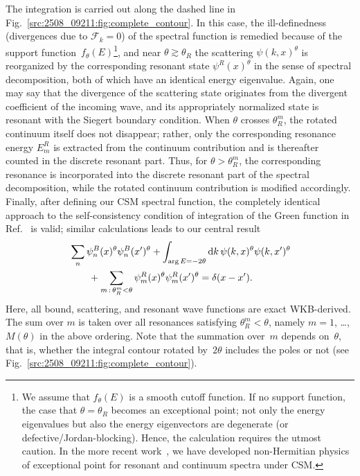 The integration is carried out along the dashed line in Fig.~\ref{src:2508_09211:fig:complete_contour}. In this case, the ill-definedness (divergences due to $\mathcal{F}_k=0$) of the spectral function is remedied because of the support function~$f_\theta(E)$\footnote{We assume that $f_\theta(E)$ is a smooth cutoff function.
If no support function, the case that $\theta=\theta_R$ becomes an exceptional point; not only the energy eigenvalues but also the energy eigenvectors are degenerate (or defective/Jordan-blocking). Hence, the calculation requires the utmost caution. In the more recent work~\cite{Morikawa:2025inx}, we have developed non-Hermitian physics of exceptional point for resonant and continuum spectra under CSM.}, and near $\theta\gtrsim\theta_R$ the scattering $\psi(k,x)^\theta$ is reorganized by the corresponding resonant state $\psi^R(x)^\theta$ in the sense of spectral decomposition, both of which have an identical energy eigenvalue. Again, one may say that the divergence of the scattering state originates from the divergent coefficient of the incoming wave, and its appropriately normalized state is resonant with the Siegert boundary condition.
When $\theta$ crosses $\theta_R^m$, the rotated continuum itself does not disappear; rather, only the corresponding resonance energy $E_m^R$ is extracted from the continuum contribution and is thereafter counted in the discrete resonant part.
Thus, for $\theta>\theta_R^m$, the corresponding resonance is incorporated into the discrete resonant part of the spectral decomposition, while the rotated continuum contribution is modified accordingly.
Finally, after defining our CSM spectral function,
the completely identical approach to the self-consistency condition of integration of the Green function in Ref.~\cite{Newton:1960} is valid; similar calculations leads to our central result
\begin{align}
    &\sum_n\psi_n^B(x)^\theta\psi_n^B(x')^\theta + \int_{\arg E=-2\theta} \mathrm{d} k\, \psi(k,x)^\theta\psi(k,x')^\theta \notag\\
    &\qquad
    + \sum_{m\,:\,\theta_R^m<\theta}\psi_m^R(x)^\theta\psi_m^R(x')^\theta
    = \delta(x-x') .
    \label{src:2508_09211:eq:complete_res}
\end{align}
Here, all bound, scattering, and resonant wave functions are exact WKB-derived.
The sum over $m$ is taken over all resonances satisfying $\theta_R^m<\theta$, namely $m=1$, \dots, $M(\theta)$ in the above ordering.
Note that the summation over~$m$ depends on~$\theta$, that is, whether the integral contour rotated by~$2\theta$ includes the poles or not (see Fig.~\ref{src:2508_09211:fig:complete_contour}).

